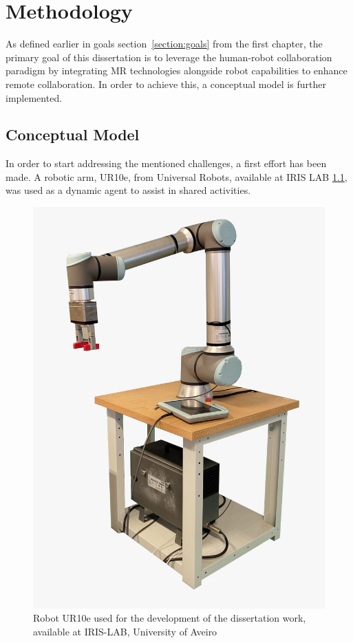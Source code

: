 \chapter{Methodology}%
\label{chapter:methodology}

As defined earlier in goals section~\ref{section:goals} from the first chapter, the primary goal of this dissertation is to leverage the human-robot collaboration paradigm by integrating \ac{MR} technologies alongside robot capabilities to enhance remote collaboration. In order to achieve this, a conceptual model is further implemented.

\section{Conceptual Model}
In order to start addressing the mentioned challenges, a first effort has been made. A robotic arm, UR10e, from Universal Robots, 
available at IRIS LAB \ref{f:ur10e_iris}, was used as a dynamic agent to assist in shared activities.

\begin{figure}[h]
    \centering
    \includegraphics[width=0.4\linewidth]{figs/ur10e.jpeg}
    \caption{Robot UR10e used for the development of the dissertation work, available at IRIS-LAB, University of Aveiro}
    \label{f:ur10e_iris}
\end{figure}

